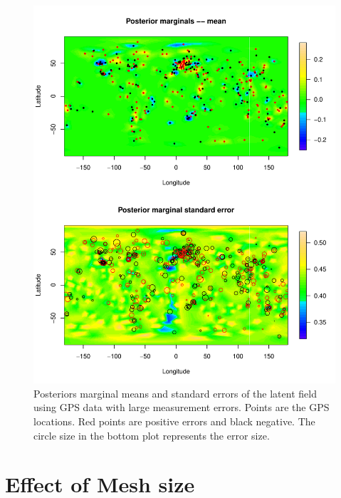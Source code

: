 \documentclass[a4paper,12pt]{article}
\begin{document}
 \begin{figure}[htbp]
 \begin{center}
 \includegraphics[scale=0.8]{fig/sMesh_LErr_GIAfield.pdf}
 \end{center}
 \caption[Posterior marginals of the latent field]{Posteriors marginal means and standard errors of the latent field using GPS data with large measurement errors. Points are the GPS locations. Red points are positive errors and black negative. The circle size in the bottom plot represents the error size.}
 \label{fig:4}
 \end{figure}
 
 
 
\section{Effect of Mesh size}
\end{document}

